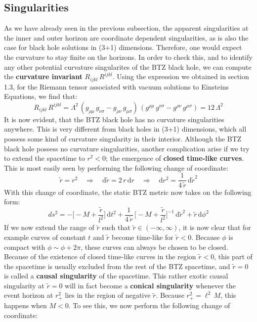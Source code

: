\newpage

\subsection{Singularities}
As we have already seen in the previous subsection, the apparent singularities at the inner and outer horizon are coordinate dependent singularities, as is also the case for black hole solutions in (3+1) dimensions. Therefore, one would expect the curvature to stay finite on the horizons. In order to check this, and to identify any other potential curvature singularites of the BTZ black hole, we can compute the \textbf{curvature invariant} $R_{ijkl} \, R^{ijkl}$. Using the expression we obtained in section 1.3, for the Riemann tensor associated with vacuum solutions to Einsteins Equations, we find that:
%
%
\begin{equation}
R_{ijkl} \, R^{ijkl}
= \Lambda^2 \, (g_{\rho\mu} \, g_{\nu\sigma} - g_{\rho\nu} \, g_{\mu\sigma}) \, 
(g^{\rho\mu} \, g^{\nu\sigma} - g^{\rho\nu} \, g^{\mu\sigma})
= 12 \, \Lambda^2
\end{equation}
%
%
It is now evident, that the BTZ black hole has no curvature singularities anywhere. This is very different from black holes in (3+1) dimensions, which all possess some kind of curvature singularity in their interior. Although the BTZ black hole possess no curvature singularities, another complication arise if we try to extend the spacetime to $r^2<0$; the emergence of \textbf{closed time-like curves}. This is most easily seen by performing the following change of coordinate:
%
%
\begin{equation}
\tilde{r} = r^2
\quad \Rightarrow \quad
\mathrm{d}\tilde{r} = 2 \, r \, \mathrm{d}r
\quad \Rightarrow \quad
\mathrm{d}r^2 = \frac{1}{4 \, \tilde{r}} \, \mathrm{d}\tilde{r}^2
\end{equation}
%
%
With this change of coordinate, the static BTZ metric now takes on the following form:
\begin{equation}
ds^2 = -\bigg[-M + \frac{\tilde{r}}{l^2} \bigg] \, \mathrm{d}t^2
+ \frac{1}{4 \, \tilde{r}} \, \bigg[-M + \frac{\tilde{r}}{l^2} \bigg]^{-1} \, \mathrm{d}\tilde{r}^2
+ \tilde{r} \, \mathrm{d}\phi^2
\end{equation}
%
%
If we now extend the range of $\tilde{r}$ such that $\tilde{r} \in (-\infty, \infty)$, it is now clear that for example curves of constant $t$ and $\tilde{r}$ become time-like for $\tilde{r} < 0$. Because $\phi$ is compact with $\phi \sim \phi + 2 \pi$, these curves can always be chosen to be closed. Because of the existence of closed time-like curves in the region $\tilde{r} < 0$, this part of the spacetime is usually excluded from the rest of the BTZ spacetime, and $\tilde{r} = 0$ is called a \textbf{causal singularity} of the spacetime. This rather exotic causal singularity at $\tilde{r} = 0$ will in fact become a \textbf{conical singularity} whenever the event horizon at $r^2_+$ lies in the region of negative $\tilde{r}$. Because $r^2_+ = \ell^2 \, M$, this happens when $M < 0$. To see this, we now perform the following change of coordinate:
